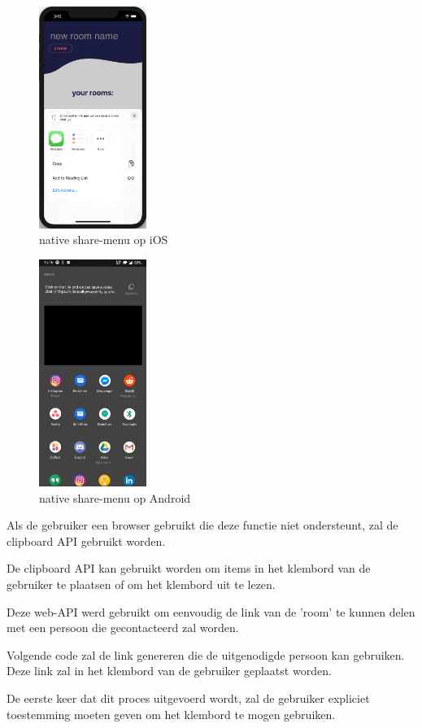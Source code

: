 		\begin{figure}[H]
			\centering
			\includegraphics[width=35mm]{./img/share-iOS}{}
			\caption{native share-menu op iOS}
		\end{figure}	
		\begin{figure}[H]
			\centering
			\includegraphics[width=35mm]{./img/share-android.jpg}{}
			\caption{native share-menu op Android}
		\end{figure}

		Als de gebruiker een browser gebruikt die deze functie niet ondersteunt, zal de clipboard API gebruikt worden.
	
		De clipboard API kan gebruikt worden om items in het klembord van de gebruiker te plaatsen of om het klembord uit te lezen.
		
		Deze web-API werd gebruikt om eenvoudig de link van de 'room' te kunnen delen met een persoon die gecontacteerd zal worden.
		
		Volgende code zal de link genereren die de uitgenodigde persoon kan gebruiken. Deze link zal in het klembord van de gebruiker geplaatst worden.
		
		De eerste keer dat dit proces uitgevoerd wordt, zal de gebruiker expliciet toestemming moeten geven om het klembord te mogen gebruiken.

